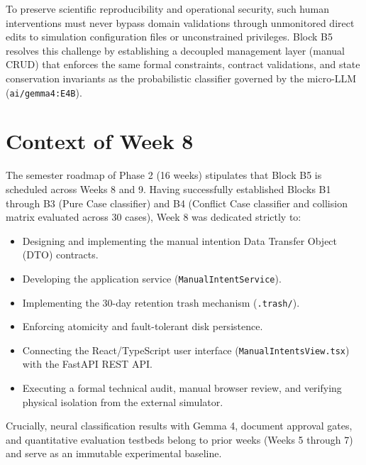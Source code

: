 \documentclass[11pt,a4paper]{article}
\begin{document}
To preserve scientific reproducibility and operational security, such human interventions must never bypass domain validations through unmonitored direct edits to simulation configuration files or unconstrained privileges. Block B5 resolves this challenge by establishing a decoupled management layer (manual CRUD) that enforces the same formal constraints, contract validations, and state conservation invariants as the probabilistic classifier governed by the micro-LLM (\texttt{ai/gemma4:E4B}).

\section{Context of Week 8}

The semester roadmap of Phase 2 (16 weeks) stipulates that Block B5 is scheduled across Weeks 8 and 9. Having successfully established Blocks B1 through B3 (Pure Case classifier) and B4 (Conflict Case classifier and collision matrix evaluated across 30 cases), Week 8 was dedicated strictly to:
\begin{itemize}[itemsep=2pt]
    \item Designing and implementing the manual intention Data Transfer Object (DTO) contracts.
    \item Developing the application service (\texttt{ManualIntentService}).
    \item Implementing the 30-day retention trash mechanism (\texttt{.trash/}).
    \item Enforcing atomicity and fault-tolerant disk persistence.
    \item Connecting the React/TypeScript user interface (\texttt{ManualIntentsView.tsx}) with the FastAPI REST API.
    \item Executing a formal technical audit, manual browser review, and verifying physical isolation from the external simulator.
\end{itemize}

Crucially, neural classification results with Gemma 4, document approval gates, and quantitative evaluation testbeds belong to prior weeks (Weeks 5 through 7) and serve as an immutable experimental baseline.

\end{document}

